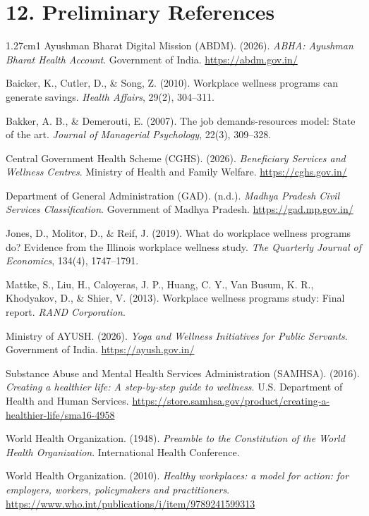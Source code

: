 \documentclass[11pt,a4paper]{article}
\begin{document}
\section{12. Preliminary References}
\vspace{0.2cm}
\small\setlength{\parindent}{0pt}
\begin{hangparas}{1.27cm}{1}
Ayushman Bharat Digital Mission (ABDM). (2026). \textit{ABHA: Ayushman Bharat Health Account}. Government of India. \url{https://abdm.gov.in/}

Baicker, K., Cutler, D., \& Song, Z. (2010). Workplace wellness programs can generate savings. \textit{Health Affairs}, 29(2), 304–311.

Bakker, A. B., \& Demerouti, E. (2007). The job demands-resources model: State of the art. \textit{Journal of Managerial Psychology}, 22(3), 309–328.

Central Government Health Scheme (CGHS). (2026). \textit{Beneficiary Services and Wellness Centres}. Ministry of Health and Family Welfare. \url{https://cghs.gov.in/}

Department of General Administration (GAD). (n.d.). \textit{Madhya Pradesh Civil Services Classification}. Government of Madhya Pradesh. \url{https://gad.mp.gov.in/}

Jones, D., Molitor, D., \& Reif, J. (2019). What do workplace wellness programs do? Evidence from the Illinois workplace wellness study. \textit{The Quarterly Journal of Economics}, 134(4), 1747–1791.

Mattke, S., Liu, H., Caloyeras, J. P., Huang, C. Y., Van Busum, K. R., Khodyakov, D., \& Shier, V. (2013). Workplace wellness programs study: Final report. \textit{RAND Corporation}.

Ministry of AYUSH. (2026). \textit{Yoga and Wellness Initiatives for Public Servants}. Government of India. \url{https://ayush.gov.in/}

Substance Abuse and Mental Health Services Administration (SAMHSA). (2016). \textit{Creating a healthier life: A step-by-step guide to wellness}. U.S. Department of Health and Human Services. \url{https://store.samhsa.gov/product/creating-a-healthier-life/sma16-4958}

World Health Organization. (1948). \textit{Preamble to the Constitution of the World Health Organization}. International Health Conference.

World Health Organization. (2010). \textit{Healthy workplaces: a model for action: for employers, workers, policymakers and practitioners}. \url{https://www.who.int/publications/i/item/9789241599313}
\end{hangparas}
\end{document}
